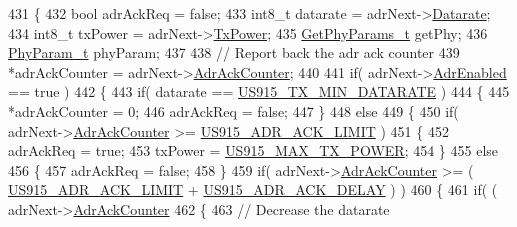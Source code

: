\begin{DoxyCode}
431 \{
432     \textcolor{keywordtype}{bool} adrAckReq = \textcolor{keyword}{false};
433     int8\_t datarate = adrNext->\mbox{\hyperlink{structs_adr_next_params_ae2f6080f3aa0e9485c55513ca56bb24d}{Datarate}};
434     int8\_t txPower = adrNext->\mbox{\hyperlink{structs_adr_next_params_a037b4f849fa8ed4aa1d3c58aef2b28ec}{TxPower}};
435     \mbox{\hyperlink{structs_get_phy_params}{GetPhyParams\_t}} getPhy;
436     \mbox{\hyperlink{unionu_phy_param}{PhyParam\_t}} phyParam;
437 
438     \textcolor{comment}{// Report back the adr ack counter}
439     *adrAckCounter = adrNext->\mbox{\hyperlink{structs_adr_next_params_a24f0356a3491bf07be9ac99ffa33896a}{AdrAckCounter}};
440 
441     \textcolor{keywordflow}{if}( adrNext->\mbox{\hyperlink{structs_adr_next_params_ab3e2fb44577c95786e11aacd56769703}{AdrEnabled}} == \textcolor{keyword}{true} )
442     \{
443         \textcolor{keywordflow}{if}( datarate == \mbox{\hyperlink{group___r_e_g_i_o_n_u_s915_ga82ad1f3ace520fc55727e442784bdcb6}{US915\_TX\_MIN\_DATARATE}} )
444         \{
445             *adrAckCounter = 0;
446             adrAckReq = \textcolor{keyword}{false};
447         \}
448         \textcolor{keywordflow}{else}
449         \{
450             \textcolor{keywordflow}{if}( adrNext->\mbox{\hyperlink{structs_adr_next_params_a24f0356a3491bf07be9ac99ffa33896a}{AdrAckCounter}} >= \mbox{\hyperlink{group___r_e_g_i_o_n_u_s915_ga46682acd6e4eb5f39516361bdec8e4e7}{US915\_ADR\_ACK\_LIMIT}} )
451             \{
452                 adrAckReq = \textcolor{keyword}{true};
453                 txPower = \mbox{\hyperlink{group___r_e_g_i_o_n_u_s915_gaa43b92e4e5cf26691dda96f7c4969c25}{US915\_MAX\_TX\_POWER}};
454             \}
455             \textcolor{keywordflow}{else}
456             \{
457                 adrAckReq = \textcolor{keyword}{false};
458             \}
459             \textcolor{keywordflow}{if}( adrNext->\mbox{\hyperlink{structs_adr_next_params_a24f0356a3491bf07be9ac99ffa33896a}{AdrAckCounter}} >= ( \mbox{\hyperlink{group___r_e_g_i_o_n_u_s915_ga46682acd6e4eb5f39516361bdec8e4e7}{US915\_ADR\_ACK\_LIMIT}} + 
      \mbox{\hyperlink{group___r_e_g_i_o_n_u_s915_gac7ffa998cf39a8f85c022b4467dfac53}{US915\_ADR\_ACK\_DELAY}} ) )
460             \{
461                 \textcolor{keywordflow}{if}( ( adrNext->\mbox{\hyperlink{structs_adr_next_params_a24f0356a3491bf07be9ac99ffa33896a}{AdrAckCounter}} %
462                 \{
463                     \textcolor{comment}{// Decrease the datarate}

\end{DoxyCode}
